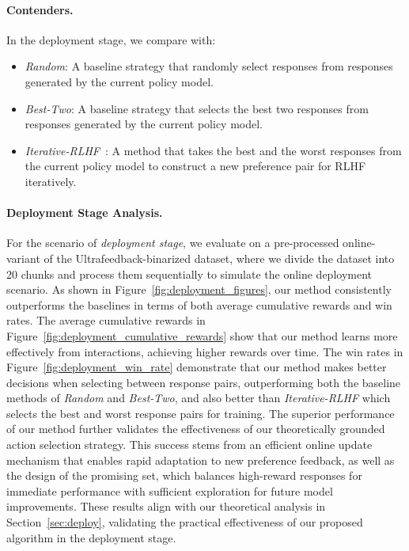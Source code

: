 \paragraph{Contenders.} In the deployment stage, we compare with:
\begin{itemize}
    \item \emph{Random}: A baseline strategy that randomly select responses from responses generated by the current policy model.
    \item \emph{Best-Two}: A baseline strategy that selects the best two responses from responses generated by the current policy model.
    \item \emph{Iterative-RLHF}~\citep{TMLR'24:Dong-RLHF}: A method that takes the best and the worst responses from the current policy model to construct a new preference pair for RLHF iteratively.
\end{itemize}

\paragraph{Deployment Stage Analysis.} For the scenario of \emph{deployment stage}, we evaluate on a pre-processed online-variant of the Ultrafeedback-binarized dataset, where we divide the dataset into 20 chunks and process them sequentially to simulate the online deployment scenario. As shown in Figure~\ref{fig:deployment_figures}, our method consistently outperforms the baselines in terms of both average cumulative rewards and win rates. The average cumulative rewards in Figure~\ref{fig:deployment_cumulative_rewards} show that our method learns more effectively from interactions, achieving higher rewards over time. The win rates in Figure~\ref{fig:deployment_win_rate} demonstrate that our method makes better decisions when selecting between response pairs, outperforming both the baseline methods of \emph{Random} and \emph{Best-Two}, and also better than \emph{Iterative-RLHF} which selects the best and worst response pairs for training. The superior performance of our method further validates the effectiveness of our theoretically grounded action selection strategy. This success stems from an efficient online update mechanism that enables rapid adaptation to new preference feedback, as well as the design of the promising set, which balances high-reward responses for immediate performance with sufficient exploration for future model improvements. These results align with our theoretical analysis in Section~\ref{sec:deploy}, validating the practical effectiveness of our proposed algorithm in the deployment stage.

